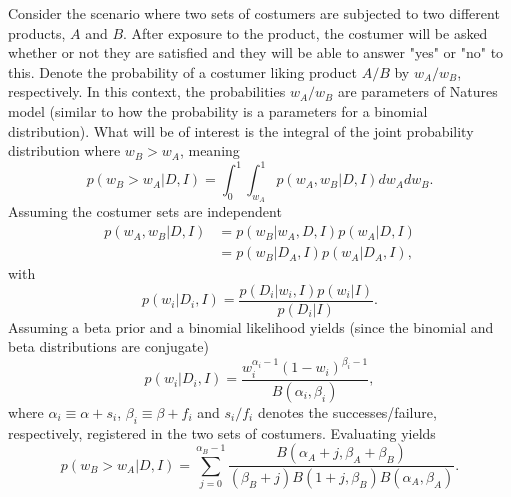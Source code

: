 \begin{example}
	Consider the scenario where two sets of costumers are subjected to two different products, $A$ and $B$. After exposure to the product, the costumer will be asked whether or not they are satisfied and they will be able to answer "yes" or "no" to this. Denote the probability of a costumer liking product $A/B$ by $w_A/w_B$, respectively. In this context, the probabilities $w_A/w_B$ are parameters of Natures model (similar to how the probability is a parameters for a binomial distribution). What will be of interest is the integral of the joint probability distribution where $w_B>w_A$, meaning
	\begin{equation}
		p(w_B > w_A|D,I)= \int_0^1\int_{w_A}^1p(w_A,w_B|D,I)dw_Adw_B.
		\label{e1}
	\end{equation}
	Assuming the costumer sets are independent
	\begin{equation}
		\begin{split}
			p(w_A,w_B|D,I) &= p(w_B|w_A,D,I)p(w_A|D,I)\\
			& = p(w_B|D_A,I)p(w_A|D_A,I),
		\end{split}
	\end{equation}
	with
	\begin{equation}
		p(w_i|D_i,I)=\frac{p(D_i|w_i,I)p(w_i|I)}{p(D_i|I)}.
	\end{equation}
	Assuming a beta prior and a binomial likelihood yields (since the binomial and beta distributions are conjugate)
	\begin{equation}
		p(w_i|D_i,I)=\frac{w_i^{\alpha_i-1}(1-w_i)^{\beta_i-1}}{B(\alpha_i,\beta_i)},
	\end{equation}
	where $\alpha_i\equiv \alpha+s_i$, $\beta_i\equiv \beta+f_i$ and $s_i/f_i$ denotes the successes/failure, respectively, registered in the two sets of costumers. Evaluating  yields
	\begin{equation}
		p(w_B > w_A|D,I)= \sum_{j=0}^{\alpha_B-1}\frac{B(\alpha_A+j,\beta_A+\beta_B)}{(\beta_B+j)B(1+j,\beta_B)B(\alpha_A,\beta_A)}.
	\end{equation}
	
\end{example}
